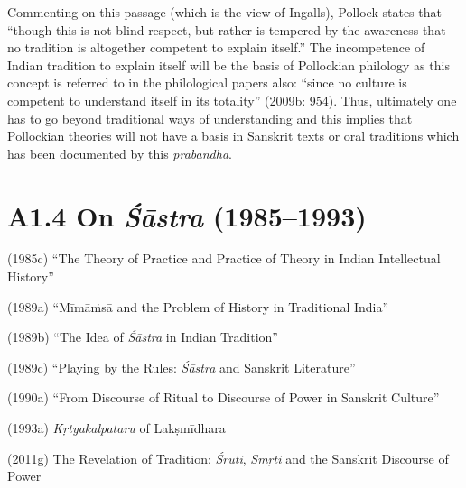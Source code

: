 Commenting on this passage (which is the view of Ingalls), Pollock states that “though this is not blind respect, but rather is tempered by the awareness that no tradition is altogether competent to explain itself.” The incompetence of Indian tradition to explain itself will be the basis of Pollockian philology as this concept is referred to in the philological papers also: “since no culture is competent to understand itself in its totality” (2009b: 954). Thus, ultimately one has to go beyond traditional ways of understanding and this implies that Pollockian theories will not have a basis in Sanskrit texts or oral traditions which has been documented by this \textit{prabandha}.

\vspace{-.3cm}

\section*{A1.4 On \textit{Śāstra} (1985–1993)}

(1985c) “The Theory of Practice and Practice of Theory in Indian Intellectual History”

(1989a) “Mīmāṁsā and the Problem of History in Traditional India”

(1989b) “The Idea of \textit{Śāstra} in Indian Tradition”

(1989c) “Playing by the Rules: \textit{Śāstra} and Sanskrit Literature”

\newpage

(1990a) “From Discourse of Ritual to Discourse of Power in Sanskrit Culture”

(1993a) \textit{Kṛtyakalpataru} of Lakṣmīdhara

(2011g) The Revelation of Tradition: \textit{Śruti}, \textit{Smṛti} and the Sanskrit Discourse of Power

